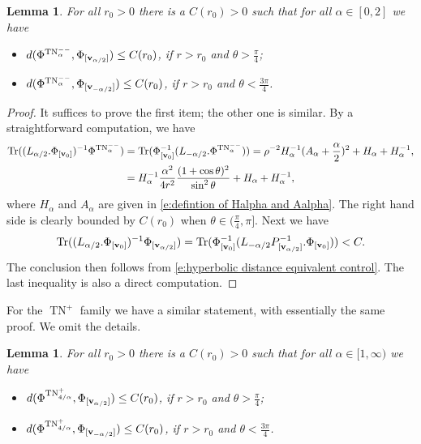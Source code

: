 \documentclass[a4paper,11pt]{amsart}
\newtheorem{lemma}[theorem]{Lemma}
\theoremstyle{definition}
\numberwithin{equation}{section}
\DeclareMathOperator{\Tr}{Tr}
\DeclareMathOperator{\bv}{{\bf v}}
\DeclareMathOperator{\TN}{TN}
\DeclareMathOperator{\TNam}{TN^{--}_\alpha}
\begin{document}
\begin{lemma}\label{l:ALF bound away turning points}
For all $r_0>0$ there is a $C(r_0)>0$  such that for all $\alpha\in [0, 2]$ we have
\begin{itemize}
\item 
    $d(\Phi^{\TNam}, \Phi_{[\bv_{\alpha/2}]})\leq  C(r_0)$, if $r>r_0$ and $\theta>\frac{\pi}{4}$;
\item 
    $d(\Phi^{\TNam}, \Phi_{[\bv_{-\alpha/2}]})\leq  C(r_0)$,  if $r>r_0$ and $\theta<\frac{3\pi}{4}$.
\end{itemize}
\end{lemma}
\begin{proof}
	It suffices to prove the first item; the other one is similar. By a straightforward computation, we have 
    \begin{align*}
        \Tr((L_{\alpha/2}.\Phi_{[\bv_0]})^{-1}\Phi^{\TNam})&=\Tr(\Phi^{-1}_{[\bv_0]}(L_{-\alpha/2}.\Phi^{\TNam}))=\rho^{-2}H_\alpha^{-1}(A_{\alpha}+\frac{\alpha}{2})^2+H_\alpha+H_{\alpha}^{-1},\\
        &=H_{\alpha}^{-1}\frac{\alpha^2}{4r^2}\frac{(1+\cos\theta)^2}{\sin^2\theta}+H_{\alpha}+H_{\alpha}^{-1},
    \end{align*}
    where $H_\alpha$ and $A_\alpha$ are given in \eqref{e:defintion of Halpha and Aalpha}.
    The right hand side is clearly bounded by $C(r_0)$ when $\theta\in(\frac{\pi}{4},\pi]$. Next we have        
    $$\Tr((L_{\alpha/2}.\Phi_{[\bv_0]})^{-1}\Phi_{[\bv_{\alpha/2}]})=\Tr(\Phi_{[\bv_0]}^{-1}(L_{-\alpha/2}P_{[\bv_{\alpha/2}]}^{-1}.\Phi_{[\bv_0]}))<C.$$
    The conclusion then follows from \eqref{e:hyperbolic distance equivalent control}. The last inequality is also a direct computation.
\end{proof}

For the $\TN^+$ family we have a similar statement, with essentially the same proof. We omit the details.
\begin{lemma}\label{l:TN+ bound away turning points}
  For all $r_0>0$ there is a $C(r_0)>0$ such that for all $\alpha\in [1,\infty)$ we have
\begin{itemize}
    \item $d(\Phi^{\TN^+_{4/\alpha}}, \Phi_{[\bv_{\alpha/2}]})\leq  C(r_0)$, if $r>r_0$ and $\theta>\frac{\pi}{4}$;
    \item $d(\Phi^{\TN^+_{4/\alpha}}, \Phi_{[\bv_{-\alpha/2}]})\leq  C(r_0)$, if $r>r_0$ and $\theta<\frac{3\pi}{4}$.
\end{itemize}
\end{lemma}
\end{document}
